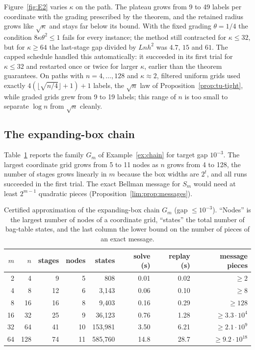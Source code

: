 Figure~\ref{fig:E2} varies $\kappa$ on the path. The plateau grows from 9 to 49
labels per coordinate with the grading prescribed by the theorem, and the
retained radius grows like $\sqrt\kappa$ and stays far below its bound. With the
fixed grading $\theta=1/4$ the condition $8\kappa\theta^2\le1$ fails for every
instance; the method still contracted for $\kappa\le32$, but for $\kappa\ge64$ the
last-stage gap divided by $Lnh^2$ was $4.7$, $15$ and $61$. The capped schedule
handled this automatically: it succeeded in its first trial for $\kappa\le32$ and
restarted once or twice for larger $\kappa$, earlier than the theorem guarantees.
On paths with $n=4,\dots,128$ and $\kappa\approx2$, filtered uniform grids used
exactly $4(\lfloor\sqrt{n/4}\rfloor+1)+1$ labels, the $\sqrt n$ law of
Proposition~\ref{prop:tu-tight}, while graded grids grew from 9 to 19 labels;
this range of $n$ is too small to separate $\log n$ from $\sqrt n$ cleanly.

\subsection{The expanding-box chain}
Table~\ref{tab:chain} reports the family $G_m$ of Example~\ref{ex:chain} for
target gap $10^{-3}$. The largest coordinate grid grows from 5 to 11 nodes as
$n$ grows from 4 to 128, the number of stages grows linearly in $m$ because the
box widths are $2^t$, and all runs succeeded in the first trial. The exact
Bellman message for $S_m$ would need at least $2^{m-1}$ quadratic pieces
(Proposition~\ref{lim:prop:messages}).

\begin{table}[t]
\centering
\caption{Certified approximation of the expanding-box chain $G_m$ (gap
$\le10^{-3}$). ``Nodes'' is the largest number of nodes of a coordinate grid,
``states'' the total number of bag-table states, and the last column the lower
bound on the number of pieces of an exact message.}\label{tab:chain}
\begin{tabular}{rrrrrrrr}
\toprule
$m$ & $n$ & stages & nodes & states & solve (s) & replay (s) & message pieces\\
\midrule
2 & 4 & 9 & 5 & 808 & 0.01 & 0.02 & $\ge2$\\
4 & 8 & 12 & 6 & 3{,}143 & 0.06 & 0.10 & $\ge8$\\
8 & 16 & 16 & 8 & 9{,}403 & 0.16 & 0.29 & $\ge128$\\
16 & 32 & 25 & 9 & 36{,}123 & 0.76 & 1.28 & $\ge3.3\cdot10^4$\\
32 & 64 & 41 & 10 & 153{,}981 & 3.50 & 6.21 & $\ge2.1\cdot10^9$\\
64 & 128 & 74 & 11 & 585{,}760 & 14.8 & 28.7 & $\ge9.2\cdot10^{18}$\\
\bottomrule
\end{tabular}
\end{table}

